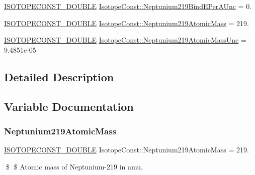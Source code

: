 \begin{DoxyCompactItemize}
\mbox{\hyperlink{group___isotope_const-_macros_ga8f45a7272ce02c0b4c65c44636ed719a}{I\+S\+O\+T\+O\+P\+E\+C\+O\+N\+S\+T\+\_\+\+D\+O\+U\+B\+LE}} \mbox{\hyperlink{group___isotope_const-_neptunium-_np219_gab6e8c561473b3e976e80ea0c3672ee0a}{Isotope\+Const\+::\+Neptunium219\+Bind\+E\+Per\+A\+Unc}} = 0.
\item 
\mbox{\hyperlink{group___isotope_const-_macros_ga8f45a7272ce02c0b4c65c44636ed719a}{I\+S\+O\+T\+O\+P\+E\+C\+O\+N\+S\+T\+\_\+\+D\+O\+U\+B\+LE}} \mbox{\hyperlink{group___isotope_const-_neptunium-_np219_gae01eae0056505a4c0ca129fe84b159e9}{Isotope\+Const\+::\+Neptunium219\+Atomic\+Mass}} = 219.
\item 
\mbox{\hyperlink{group___isotope_const-_macros_ga8f45a7272ce02c0b4c65c44636ed719a}{I\+S\+O\+T\+O\+P\+E\+C\+O\+N\+S\+T\+\_\+\+D\+O\+U\+B\+LE}} \mbox{\hyperlink{group___isotope_const-_neptunium-_np219_gad21980a7c3aef9fa84dcb27145dc516e}{Isotope\+Const\+::\+Neptunium219\+Atomic\+Mass\+Unc}} = 9.\+4851e-\/05
\end{DoxyCompactItemize}


\subsection{Detailed Description}


\subsection{Variable Documentation}
\mbox{\label{group___isotope_const-_neptunium-_np219_gae01eae0056505a4c0ca129fe84b159e9}} 
\subsubsection{\texorpdfstring{Neptunium219\+Atomic\+Mass}{Neptunium219AtomicMass}}
{\footnotesize\ttfamily \mbox{\hyperlink{group___isotope_const-_macros_ga8f45a7272ce02c0b4c65c44636ed719a}{I\+S\+O\+T\+O\+P\+E\+C\+O\+N\+S\+T\+\_\+\+D\+O\+U\+B\+LE}} Isotope\+Const\+::\+Neptunium219\+Atomic\+Mass = 219.}

\$ \$ Atomic mass of Neptunium-\/219 in amu. \mbox{\label{group___isotope_const-_neptunium-_np219_gad21980a7c3aef9fa84dcb27145dc516e}} 
